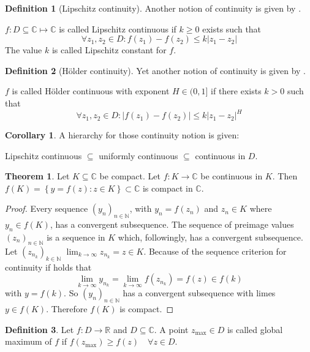 \documentclass[a4paper,landscape,twocolumn]{article}
\theoremstyle{definition}
\newtheorem{theorem}{Theorem}
\newtheorem{defi}{Definition}
\newtheorem{cor}{Corollary}
\newcommand\set[1]{\left\{#1\right\}}
\newcommand\abs[1]{\left|#1\right|}
\begin{document}
%
\begin{defi}[Lipschitz continuity]
  Another notion of continuity is given by .

  $f: D \subseteq \mathbb C \mapsto \mathbb C$ is called Lipschitz continuous
  if $k \geq 0$ exists such that
  \[
    \forall z_1, z_2 \in D:
    f(z_1) - f(z_2) \leq k \abs{z_1 - z_2}
  \]
  The value $k$ is called Lipschitz constant for $f$.
\end{defi}
%
\begin{defi}[Hölder continuity]
  Yet another notion of continuity is given by .

  $f$ is called Hölder continuous with exponent $H \in (0, 1]$ if there exists
  $k > 0$ such that
  \[ \forall z_1, z_2 \in D: \abs{f(z_1) - f(z_2)} \leq k \abs{z_1 - z_2}^H \]
\end{defi}
%
\begin{cor}
  A hierarchy for those continuity notion is given:

  Lipschitz continuous $\subseteq$ uniformly continuous $\subseteq$ continuous in $D$.
\end{cor}
%
\begin{theorem}
  Let $K \subseteq \mathbb C$ be compact. Let $f: K \rightarrow \mathbb C$ be continuous
  in $K$. Then $f(K) = \set{y = f(z): z \in K} \subset \mathbb C$ is compact in $\mathbb C$.
\end{theorem}
\begin{proof}
  Every sequence $(y_n)_{n \in \mathbb N}$,
  with $y_n = f(z_n)$ and $z_n \in K$ where $y_n \in f(K)$,
  has a convergent subsequence. The sequence of preimage values $(z_n)_{n \in \mathbb N}$
  is a sequence in $K$ which, followingly, has a convergent subsequence.
  Let $(z_{n_k})_{k \in \mathbb N}$
  $\lim_{k \to \infty} z_{n_k} = z \in K$.
  Because of the sequence criterion for continuity if holds that
  \[ \lim_{k \to \infty} y_{n_k} = \lim_{k \to \infty} f(z_{n_k}) = f(z) \in f(k) \]
  with $y = f(k)$.
  So $(y_n)_{n \in \mathbb N}$ has a convergent subsequence with limes $y \in f(K)$.
  Therefore $f(K)$ is compact.
\end{proof}
%
\begin{defi}
  Let $f: D \rightarrow \mathbb R$ and $D \subseteq \mathbb C$. A point $z_{\text{max}} \in D$
  is called global maximum of $f$ if $f(z_{\text{max}}) \geq f(z) \quad\forall z \in D$.
\end{defi}
\end{document}
